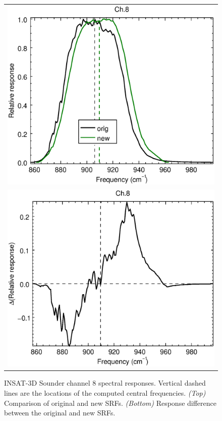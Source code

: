 \begin{figure}[H]
  \centering
  \begin{tabular}{c}
    \includegraphics[scale=0.55]{graphics/sndr/srf/sndr_insat3d-8.eps} \\
    \includegraphics[scale=0.55]{graphics/sndr/srf/sndr_insat3d-8.difference.eps}
  \end{tabular}
  \caption{INSAT-3D Sounder channel 8 spectral responses. Vertical dashed lines are the locations of the computed central frequencies. \emph{(Top)} Comparison of original and new SRFs. \emph{(Bottom)} Response difference between the original and new SRFs.}
  \label{fig:sndr_ch8}
\end{figure}


